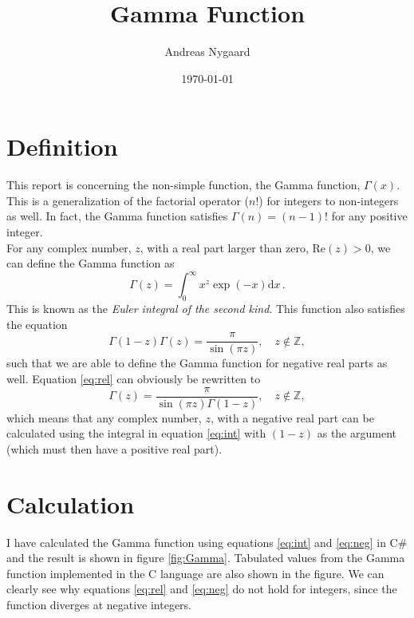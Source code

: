 \documentclass{article}
\begin{document}
\title{Gamma Function}
\author{Andreas Nygaard}
\date{\today}
\maketitle

\section{Definition}

This report is concerning the non-simple function, the Gamma function, $\Gamma(x)$. This is a generalization
of the factorial operator ($n!$) for integers to non-integers as well. In fact, the Gamma function satisfies
$\Gamma(n)=(n-1)!$ for any positive integer. 
\\

For any complex number, $z$, with a real part larger than zero, $\mathrm{Re}(z)>0$, we can define the Gamma
function as\cite{wiki}
\begin{equation}
	\Gamma(z)=\int_0^\infty x^z\exp(-x) \mathrm{d}x \,.
\end{equation}\label{eq:int}
This is known as the \textit{Euler integral of the second kind}. This function also satisfies the equation
\cite{wiki}
\begin{equation}\label{eq:rel}
	\Gamma(1-z)\Gamma(z)=\frac{\pi}{\sin(\pi z)},\quad z \notin \mathbb{Z},
\end{equation}
such that we are able to define the Gamma function for negative real parts as well. Equation \ref{eq:rel}
can obviously be rewritten to
\begin{equation}\label{eq:neg}
	\Gamma(z)=\frac{\pi}{\sin(\pi z)\Gamma(1-z)},\quad z \notin \mathbb{Z},
\end{equation}
which means that any complex number, $z$,  with a negative real part can be calculated using the integral
in equation \ref{eq:int} with $(1-z)$ as the argument (which must then have a positive real part).

\section{Calculation}

I have calculated the Gamma function using equations \ref{eq:int} and \ref{eq:neg} in C\# and the result is
shown in figure \ref{fig:Gamma}. Tabulated values from the Gamma function implemented in the C language
are also shown in the figure. We can clearly see why equations \ref{eq:rel} and \ref{eq:neg} do not hold for integers,
since the function diverges at negative integers.
\end{document}
